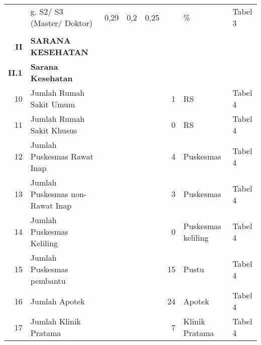 \begin{small}
\begin{longtable}{rY{12em}rrrrY{5em}Y{5em}}
		& g. S2/ S3 (Master/ Doktor)                                                  &   0,29 &    0,2 &               0,25 &          & \%                             & Tabel 3  \\
	    &                                                                             &        &        &                    &          &                                &          \\ 
    \textbf{II} & \textbf{SARANA KESEHATAN}                                           &        &        &                    &          &                                &          \\
    \textbf{II.1} & \textbf{Sarana Kesehatan}                                         &        &        &                    &          &                                &          \\
	 10 & Jumlah Rumah Sakit Umum                                                     &        &        &                    &        1 & RS                             & Tabel 4  \\
	 11 & Jumlah Rumah Sakit Khusus                                                   &        &        &                    &        0 & RS                             & Tabel 4  \\
	 12 & Jumlah Puskesmas Rawat Inap                                                 &        &        &                    &        4 & Puskesmas                      & Tabel 4  \\
	 13 & Jumlah Puskesmas non-Rawat Inap                                             &        &        &                    &        3 & Puskesmas                      & Tabel 4  \\
	 14 & Jumlah Puskesmas Keliling                                                   &        &        &                    &        0 & Puskesmas keliling             & Tabel 4  \\
	 15 & Jumlah Puskesmas pembantu                                                   &        &        &                    &       15 & Pustu                          & Tabel 4  \\
	 16 & Jumlah Apotek                                                               &        &        &                    &       24 & Apotek                         & Tabel 4  \\
	 17 & Jumlah Klinik Pratama                                                       &        &        &                    &        7 & Klinik Pratama                 & Tabel 4  \\

\end{longtable}
\end{small}

